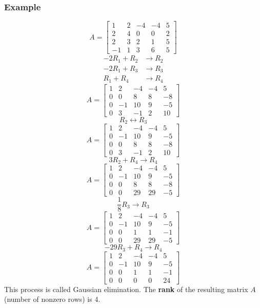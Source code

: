 \documentclass{math}
\begin{document}
\subsubsection*{Example}
\[ A = \begin{bmatrix}
  1 & 2 & -4 & -4 & 5 \\
  2 & 4 & 0 & 0 & 2 \\
  2 & 3 & 2 & 1 & 5 \\
  -1 & 1 & 3 & 6 & 5
\end{bmatrix} \]
\begin{align*}
  -2R_1+R_2 &\to R_2 \\
  -2R_1+R_3 &\to R_3 \\
  R_1+R_4 &\to R_4
\end{align*}
\[ A = \begin{bmatrix}
  1 & 2 & -4 & -4 & 5 \\
  0 & 0 & 8 & 8 & -8 \\
  0 & -1 & 10 & 9 & -5 \\
  0 & 3 & -1 & 2 & 10
\end{bmatrix} \]
\[ R_2 \leftrightarrow R_3 \]
\[ A = \begin{bmatrix}
  1 & 2 & -4 & -4 & 5 \\
  0 & -1 & 10 & 9 & -5 \\
  0 & 0 & 8 & 8 & -8 \\
  0 & 3 & -1 & 2 & 10
\end{bmatrix} \]
\[ 3R_2+R_4 \to R_4 \]
\[ A = \begin{bmatrix}
  1 & 2 & -4 & -4 & 5 \\
  0 & -1 & 10 & 9 & -5 \\
  0 & 0 & 8 & 8 & -8 \\
  0 & 0 & 29 & 29 & -5
\end{bmatrix} \]
\[ \frac{1}{8}R_3 \to R_3 \]
\[ A = \begin{bmatrix}
  1 & 2 & -4 & -4 & 5 \\
  0 & -1 & 10 & 9 & -5 \\
  0 & 0 & 1 & 1 & -1 \\
  0 & 0 & 29 & 29 & -5
\end{bmatrix} \]
\[ -29R_3+R_4 \to R_4 \]
\[ A = \begin{bmatrix}
  1 & 2 & -4 & -4 & 5 \\
  0 & -1 & 10 & 9 & -5 \\
  0 & 0 & 1 & 1 & -1 \\
  0 & 0 & 0 & 0 & 24
\end{bmatrix} \]
This process is called Gaussian elimination. The \textbf{rank} of the resulting
matrix \( A \) (number of nonzero rows) is 4.
\end{document}
